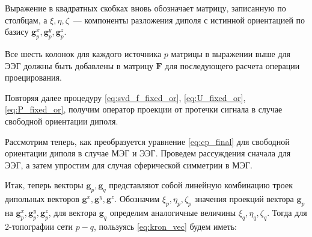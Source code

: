 Выражение в квадратных скобках вновь обозначает матрицу, записанную по столбцам,
а $\xi, \eta, \zeta$~--- компоненты разложения диполя с истинной ориентацией по базису
$\mathbf{g}_p^x,\mathbf{g}_p^y,\mathbf{g}_p^z$.

Все шесть колонок для каждого источника $p$ матрицы в выражении выше для ЭЭГ должны быть добавлены
в матрицу $\mathbf{F}$ для последующего расчета операции проецирования.

Повторяя далее процедуру \ref{eq:svd_f_fixed_or}, \ref{eq:U_fixed_or}, \ref{eq:P_fixed_or}, получим
оператор проекции от протечки сигнала в случае свободной ориентации диполя.

Рассмотрим теперь, как преобразуется уравнение \ref{eq:cp_final}
для свободной ориентации диполя в случае МЭГ и ЭЭГ.
Проведем рассуждения сначала для ЭЭГ, а затем упростим для случая сферической симметрии в МЭГ.

Итак, теперь векторы $\mathbf{g}_p, \mathbf{g}_q$ представляют собой
линейную комбинацию троек дипольных векторов $\mathbf{g}^x, \mathbf{g}^y, \mathbf{g}^z$.
Обозначим $\xi_p, \eta_p, \zeta_p$ значения проекций вектора $\mathbf{g}_p$ на
$\mathbf{g}_p^x, \mathbf{g}_p^y, \mathbf{g}_p^z$, для вектора $\mathbf{g}_q$ определим аналогичные величины
$\xi_q, \eta_q, \zeta_q$. Тогда для 2-топографии сети $p-q$, пользуясь \ref{eq:kron_vec} будем иметь:

